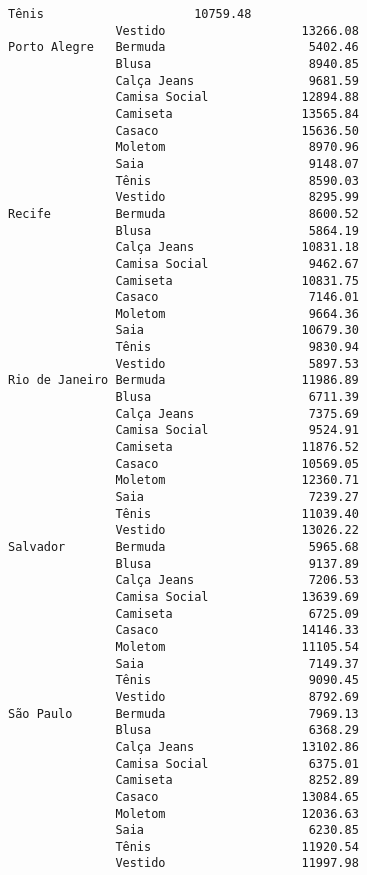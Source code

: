 \documentclass[11pt]{article}
\makeatletter
\newcommand{\boxspacing}{\kern\kvtcb@left@rule\kern\kvtcb@boxsep}
\newcommand{\prompt}[4]{
        {\ttfamily\llap{{\color{#2}[#3]:\hspace{3pt}#4}}\vspace{-\baselineskip}}
    }
\makeatother
\begin{document}
\begin{Verbatim}[commandchars=\\\{\}]
               Tênis                     10759.48
               Vestido                   13266.08
Porto Alegre   Bermuda                    5402.46
               Blusa                      8940.85
               Calça Jeans                9681.59
               Camisa Social             12894.88
               Camiseta                  13565.84
               Casaco                    15636.50
               Moletom                    8970.96
               Saia                       9148.07
               Tênis                      8590.03
               Vestido                    8295.99
Recife         Bermuda                    8600.52
               Blusa                      5864.19
               Calça Jeans               10831.18
               Camisa Social              9462.67
               Camiseta                  10831.75
               Casaco                     7146.01
               Moletom                    9664.36
               Saia                      10679.30
               Tênis                      9830.94
               Vestido                    5897.53
Rio de Janeiro Bermuda                   11986.89
               Blusa                      6711.39
               Calça Jeans                7375.69
               Camisa Social              9524.91
               Camiseta                  11876.52
               Casaco                    10569.05
               Moletom                   12360.71
               Saia                       7239.27
               Tênis                     11039.40
               Vestido                   13026.22
Salvador       Bermuda                    5965.68
               Blusa                      9137.89
               Calça Jeans                7206.53
               Camisa Social             13639.69
               Camiseta                   6725.09
               Casaco                    14146.33
               Moletom                   11105.54
               Saia                       7149.37
               Tênis                      9090.45
               Vestido                    8792.69
São Paulo      Bermuda                    7969.13
               Blusa                      6368.29
               Calça Jeans               13102.86
               Camisa Social              6375.01
               Camiseta                   8252.89
               Casaco                    13084.65
               Moletom                   12036.63
               Saia                       6230.85
               Tênis                     11920.54
               Vestido                   11997.98
    \end{Verbatim}

    
    \begin{tcolorbox}[breakable, size=fbox, boxrule=1pt, pad at break*=1mm,colback=cellbackground, colframe=cellborder]
\prompt{In}{incolor}{ }{\boxspacing}
\begin{Verbatim}[commandchars=\\\{\}]

\end{Verbatim}
\end{tcolorbox}


    
    
    
\end{document}
